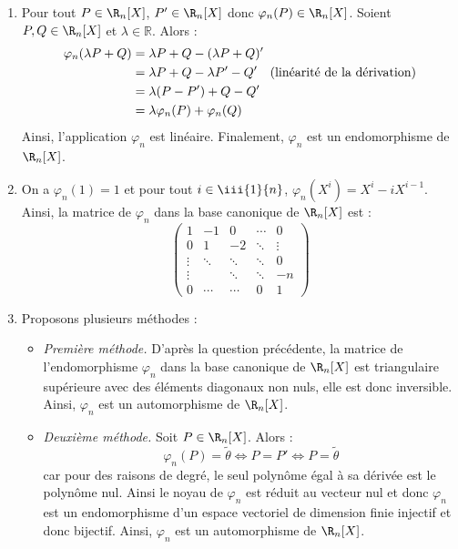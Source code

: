 \documentclass[a4paper,twoside,french,11pt]{VcCours}
\begin{document}
\begin{Exercice}{}\end{Exercice}
\begin{enumerate}
\item Pour tout $P\in \R_n[X]$, $P' \in \R_n[X]$ donc $\varphi_n(P) \in \R_n[X]$. Soient $P,Q \in  \R_n[X]$ et $\lambda \in \mathbb{R}$. Alors :
\begin{align*}
\varphi_n(\lambda P+Q) & = \lambda P + Q - (\lambda P+Q)' \\
& = \lambda P + Q - \lambda P' - Q' \quad \hbox{(linéarité de la dérivation)} \\
& = \lambda(P-P') + Q-Q' \\
& = \lambda \varphi_n(P) + \varphi_n(Q) 
\end{align*}
Ainsi, l'application $\varphi_n$ est linéaire. Finalement, $\varphi_n$ est un endomorphisme de $\R_n[X]$.
\item On a $\varphi_n(1)=1$ et pour tout  $i \in  \iii{1}{n}$, $\varphi_n(X^i)=X^i-iX^{i-1}$. Ainsi, la matrice de $\varphi_n$ dans la base canonique de $\R_n[X]$ est :
$$\begin{pmatrix}
1&-1&0&\cdots&0\\0&1&-2&\ddots&\vdots\\ \vdots&\ddots&\ddots&\ddots&0\\\vdots&&\ddots&\ddots&-n\\0&\cdots&\cdots&0&1
\end{pmatrix}$$

\item Proposons plusieurs méthodes :
\begin{itemize} 
\item \textit{Première méthode.} D'après la question précédente, la matrice de l'endomorphisme $\varphi _n$ dans la base canonique de $\R_n[X]$ est triangulaire supérieure avec des éléments diagonaux non nuls, elle est donc inversible. Ainsi, $\varphi _n$ est un automorphisme de $\R_n[X]$.
\item \textit{Deuxième méthode.} Soit $P \in \R_n[X]$. Alors :
$$ \varphi_n(P) = \tilde{\theta} \Longleftrightarrow P=P' \Longleftrightarrow P = \tilde{\theta}$$
car pour des raisons de degré, le seul polynôme égal à sa dérivée est le polynôme nul. Ainsi le noyau de $\varphi_n$ est réduit au vecteur nul et donc $\varphi_n$ est un endomorphisme d'un espace vectoriel de dimension finie injectif et donc bijectif. Ainsi, $\varphi _n$ est un automorphisme de $\R_n[X]$.
\end{itemize}


\end{enumerate}
\end{document}

